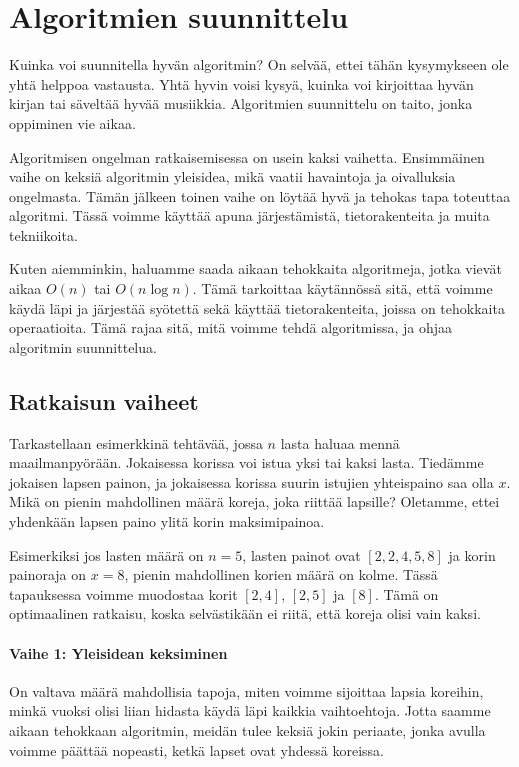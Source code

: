 \chapter{Algoritmien suunnittelu}

Kuinka voi suunnitella hyvän algoritmin?
On selvää, ettei tähän kysymykseen ole yhtä helppoa vastausta.
Yhtä hyvin voisi kysyä, kuinka voi kirjoittaa hyvän kirjan
tai säveltää hyvää musiikkia.
Algoritmien suunnittelu on taito, jonka oppiminen vie aikaa.

Algoritmisen ongelman ratkaisemisessa on usein kaksi vaihetta.
Ensim\-mäinen vaihe on keksiä algoritmin yleisidea,
mikä vaatii havaintoja ja oivalluksia ongelmasta.
Tämän jälkeen toinen vaihe on löytää hyvä ja tehokas tapa
toteuttaa algoritmi.
Tässä voimme käyttää apuna järjestämistä, tietorakenteita
ja muita tekniikoita.

Kuten aiemminkin, haluamme saada aikaan tehokkaita algoritmeja,
jotka vievät aikaa $O(n)$ tai $O(n \log n)$.
Tämä tarkoittaa käytännössä sitä, että voimme käydä läpi ja
järjestää syötettä sekä käyttää tietorakenteita,
joissa on tehokkaita operaatioita.
Tämä rajaa sitä, mitä voimme tehdä algoritmissa, ja ohjaa
algoritmin suunnittelua.

\section{Ratkaisun vaiheet}

Tarkastellaan esimerkkinä tehtävää,
jossa $n$ lasta haluaa mennä maailmanpyörään.
Jokaisessa korissa voi istua yksi tai kaksi lasta.
Tiedämme jokaisen lapsen painon,
ja jokaisessa korissa suurin istujien
yhteispaino saa olla $x$.
Mikä on pienin mahdollinen määrä koreja,
joka riittää lapsille?
Oletamme, ettei yhdenkään lapsen paino ylitä
korin maksimipainoa.

Esimerkiksi jos lasten määrä on $n=5$,
lasten painot ovat $[2,2,4,5,8]$ ja korin painoraja on $x=8$,
pienin mahdollinen korien määrä on kolme.
Tässä tapauksessa voimme muodostaa korit
$[2,4]$, $[2,5]$ ja $[8]$.
Tämä on optimaalinen ratkaisu, koska selvästikään
ei riitä, että koreja olisi vain kaksi.

\subsubsection{Vaihe 1: Yleisidean keksiminen}

On valtava määrä mahdollisia tapoja,
miten voimme sijoittaa lapsia koreihin,
minkä vuoksi olisi liian hidasta käydä läpi
kaikkia vaihtoehtoja.
Jotta saamme aikaan tehokkaan algoritmin,
meidän tulee keksiä jokin periaate,
jonka avulla voimme päättää nopeasti,
ketkä lapset ovat yhdessä koreissa.

